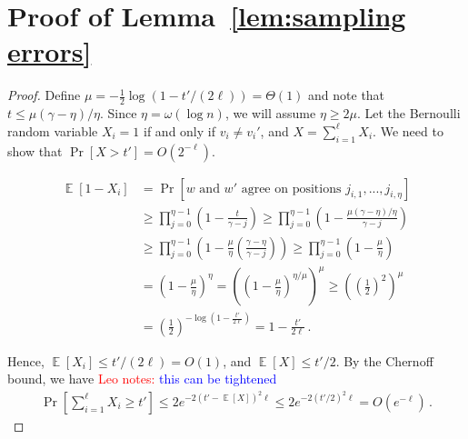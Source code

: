 \documentclass[11pt]{article}
\newcommand{\lemref}[1]{\mbox{Lemma~\ref{#1}}}
\DeclareMathOperator*{\expe}{\mathbb{E}}
\newcommand{\authnote}[2]{{\textcolor{red}{\textsf{#1 notes: }\textcolor{blue}{ #2}}\marginpar{\textcolor{red}{\textbf{!!!!!}}}}}
\newcommand{\authnote}[2]{}
\newcommand{\lnote}[1]{{\authnote{Leo}{#1}}}
\begin{document}
\section{Proof of \lemref{lem:sampling errors}}
\label{sec:sampling errors}

\begin{proof}
Define $\mu = -\frac{1}{2}\log(1-t'/(2\ell)) = \Theta(1)$ and note that $t \leq \mu(\gamma - \eta)/\eta$. Since $\eta = \omega(\log n)$, we will assume
$\eta\ge 2\mu$.
Let
the Bernoulli random variable $X_i=1$ if and only if $v_i \neq v_i'$, and $X=\sum_{i=1}^{\ell} X_i$. We need to show that $\Pr[X>t']=O(2^{-\ell})$.

\begin{align*}
\expe [1-X_i] &=\Pr[w \text{ and } w' \text{ agree on positions } {j_{i,1}},..., j_{i,\eta}]\\
&\geq \prod_{j=0}^{\eta-1}\left(1 - \frac{t}{\gamma-j}\right)\geq \prod_{j=0}^{\eta-1}\left( 1-\frac{\mu(\gamma-\eta)/\eta}{\gamma-j}\right)\\
&\geq  \prod_{j=0}^{\eta-1}\left( 1-\frac{\mu}{\eta}\left(\frac{\gamma-\eta}{\gamma-j}\right)\right)\geq \prod_{j=0}^{\eta-1}\left( 1-\frac{\mu}{\eta}\right) \\
&= \left(1-\frac{\mu}{\eta}\right)^{\eta} =\left( \left(1-\frac{\mu}{\eta}\right)^{\eta/\mu}\right)^\mu\geq \left(\left(\frac{1}{2}\right)^2\right)^\mu\\
& = \left(\frac{1}{2}\right)^{-\log\left(1-\frac{t'}{2\ell}\right)} = 1-\frac{t'}{2\ell}\,.
\end{align*}

Hence, $\expe[X_i]\le t'/(2\ell) = O(1)$, and $\expe[X]\le t'/2$.
By the Chernoff bound, we have \lnote{this can be tightened}
\begin{align*}
\Pr\left[\sum_{i=1}^\ell X_i\geq t'\right]\leq 2e^{-2(t'-\expe[X])^2\ell} \le
2e^{-2(t'/2)^2\ell} = O(e^{- \ell})\,.
\end{align*}
\end{proof}
\end{document}
